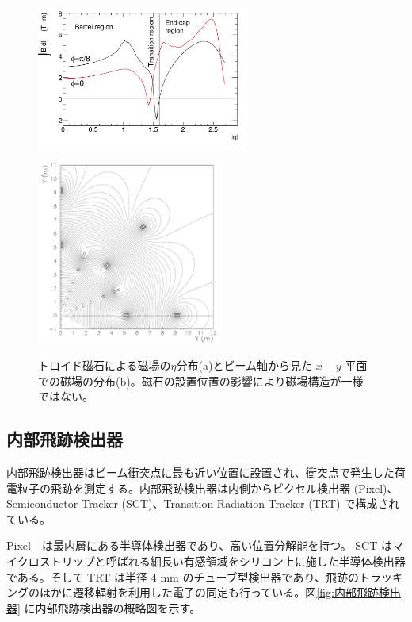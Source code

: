\begin{figure}
    \centering
    \begin{minipage}[b]{0.4\linewidth}
        \centering
        \includegraphics[clip, width=7cm]{fig/2/IBdl.pdf}
        \vspace{10pt}
        \subcaption{}
        \label{fig:磁場eta}
    \end{minipage}
    \hfill
    \begin{minipage}[b]{0.5\linewidth}
        \centering
        \includegraphics[clip, width=6cm]{fig/2/FMBmap.pdf}
        \vspace{10pt}
        \subcaption{}
        \label{fig:磁場平面}
    \end{minipage}
    \caption{トロイド磁石による磁場の$\eta$分布(a)とビーム軸から見た $x − y$ 平面での磁場の分布(b)。磁石の設置位置の影響により磁場構造が一様ではない。}
    \label{fig:磁場}
\end{figure}




\subsection{内部飛跡検出器}
内部飛跡検出器はビーム衝突点に最も近い位置に設置され、衝突点で発生した荷電粒子の飛跡を測定する。内部飛跡検出器は内側からピクセル検出器 (Pixel)、Semiconductor Tracker (SCT)、Transition Radiation Tracker (TRT) で構成されている。

Pixel　は最内層にある半導体検出器であり、高い位置分解能を持つ。
SCT はマイクロストリップと呼ばれる細長い有感領域をシリコン上に施した半導体検出器である。そして TRT は半径 4 mm のチューブ型検出器であり、飛跡のトラッキングのほかに遷移輻射を利用した電子の同定も行っている。図\ref{fig:内部飛跡検出器} に内部飛跡検出器の概略図を示す。

